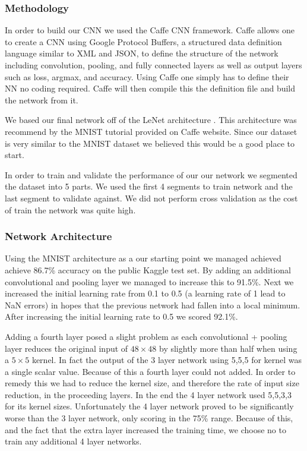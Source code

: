 \documentclass[10pt,twocolumn]{article}
\begin{document}
\subsubsection{Methodology}
In order to build our CNN we used the Caffe \cite{jia2014caffe} CNN framework. Caffe allows one to create a CNN using Google Protocol Buffers, a structured data definition language similar to XML and JSON, to define the structure of the network including convolution, pooling, and fully connected layers as well as output layers such as loss, argmax, and accuracy. Using Caffe one simply has to define their NN no coding required. Caffe will then compile this the definition file and build the network from it.

We based our final network off of the LeNet architecture \cite{leCunnGradient}. This architecture was recommend by the MNIST tutorial provided on Caffe website. Since our dataset is very similar to the MNIST dataset we believed this would be a good place to start. 

In order to train and validate the performance of our our network we segmented the dataset into 5 parts. We used the first 4 segments to train network and the last segment to validate against. We did not perform cross validation as the cost of train the network was quite high. 
\subsubsection{Network Architecture}
Using the MNIST architecture as a our starting point we managed achieved achieve 86.7\% accuracy on the public Kaggle test set. By adding an additional convolutional and pooling layer we managed to increase this to 91.5\%. Next we increased the initial learning rate from 0.1 to 0.5 (a learning rate of 1 lead to NaN errors) in hopes that the previous network had fallen into a local minimum. After increasing the initial learning rate to 0.5 we scored 92.1\%. 

Adding a fourth layer posed a slight problem as each convolutional + pooling layer reduces the original input of $48 \times 48$ by slightly more than half when using a $5 \times 5$ kernel. In fact the output of the 3 layer network using 5,5,5 for kernel was a single scalar value. Because of this a fourth layer could not added. In order to remedy this we had to reduce the kernel size, and therefore the rate of input size reduction, in the proceeding layers. In the end the 4 layer network used 5,5,3,3 for its kernel sizes. Unfortunately the 4 layer network proved to be significantly worse than the 3 layer network, only scoring in the 75\% range. Because of this, and the fact that the extra layer increased the training time, we choose no to train any additional 4 layer networks.
 
\end{document}
